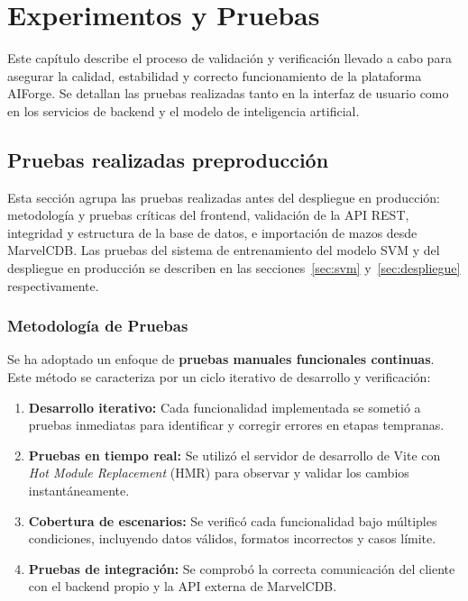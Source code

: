 \chapter{Experimentos y Pruebas}

Este capítulo describe el proceso de validación y verificación llevado a cabo para asegurar la calidad, estabilidad y correcto funcionamiento de la plataforma AIForge. Se detallan las pruebas realizadas tanto en la interfaz de usuario como en los servicios de backend y el modelo de inteligencia artificial.

\section{Pruebas realizadas preproducción}

Esta sección agrupa las pruebas realizadas antes del despliegue en producción: metodología y pruebas críticas del frontend, validación de la API REST, integridad y estructura de la base de datos, e importación de mazos desde MarvelCDB. Las pruebas del sistema de entrenamiento del modelo SVM y del despliegue en producción se describen en las secciones~\ref{sec:svm} y~\ref{sec:despliegue} respectivamente.

\subsection{Metodología de Pruebas}

Se ha adoptado un enfoque de \textbf{pruebas manuales funcionales continuas}. Este método se caracteriza por un ciclo iterativo de desarrollo y verificación:

\begin{enumerate}
    \item \textbf{Desarrollo iterativo:} Cada funcionalidad implementada se sometió a pruebas inmediatas para identificar y corregir errores en etapas tempranas.
    \item \textbf{Pruebas en tiempo real:} Se utilizó el servidor de desarrollo de Vite con \textit{Hot Module Replacement} (HMR) para observar y validar los cambios instantáneamente.
    \item \textbf{Cobertura de escenarios:} Se verificó cada funcionalidad bajo múltiples condiciones, incluyendo datos válidos, formatos incorrectos y casos límite.
    \item \textbf{Pruebas de integración:} Se comprobó la correcta comunicación del cliente con el backend propio y la API externa de MarvelCDB.
\end{enumerate}

